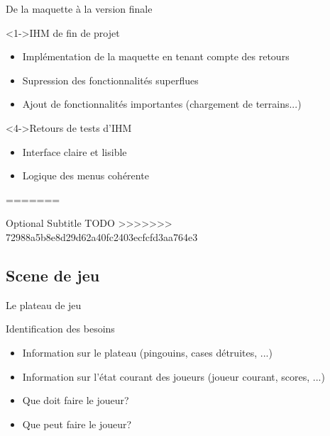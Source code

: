 \documentclass{beamer}
\begin{document}
\begin{frame}{De la maquette à la version finale}
  \begin{block}<1->{IHM de fin de projet}
	\begin{itemize}
	\item <1-> Implémentation de la maquette en tenant compte des retours
	\item <2-> Supression des fonctionnalités superflues
	\item <3-> Ajout de fonctionnalités importantes (chargement de terrains...)
  	\end{itemize}
  \end{block}
  \begin{example}<4->{Retours de tests d'IHM}
    \begin{itemize}
	\item <4-> Interface claire et lisible
	\item <5-> Logique des menus cohérente
	\end{itemize}
  \end{example}
=======
\begin{frame}{}{Optional Subtitle}
TODO
>>>>>>> 72988a5b8e8d29d62a40fc2403ecfcfd3aa764e3
\end{frame}

\subsection{Scene de jeu}

\begin{frame}{Le plateau de jeu}
  \begin{block}{Identification des besoins}
    \begin{itemize}
    \item <1-> Information sur le plateau (pingouins, cases détruites, ...)
    \item <2-> Information sur l'état courant des joueurs (joueur courant, scores, ...)
    \item <3-> Que doit faire le joueur?
    \item <4-> Que peut faire le joueur?
    \end{itemize}
  \end{block}
\end{frame}


\end{frame}
\end{document}
